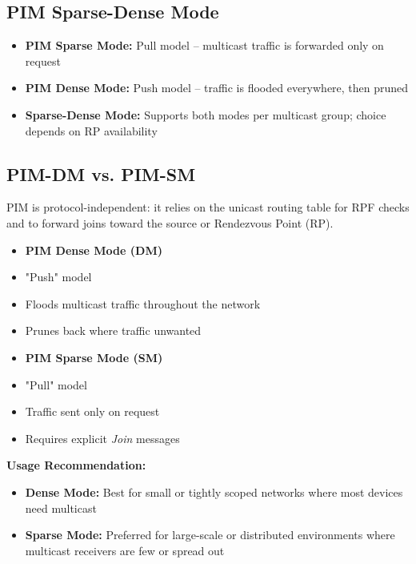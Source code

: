 \begin{multicols*}{5}
		\subsection{PIM Sparse-Dense Mode}
		\begin{itemize}
			\item \textbf{PIM Sparse Mode:} Pull model – multicast traffic is forwarded only on request
			\item \textbf{PIM Dense Mode:} Push model – traffic is flooded everywhere, then pruned
			\item \textbf{Sparse-Dense Mode:} Supports both modes per multicast group; choice depends on RP availability
		\end{itemize}
		
		\subsection{PIM-DM vs. PIM-SM}
		PIM is protocol-independent: it relies on the unicast routing table for RPF checks and to forward joins toward the source or Rendezvous Point (RP).
		
		\noindent\begin{minipage}{\linewidth}
			\setlength\multicolsep{1pt}%
			\begin{multicols}{2}
				\begin{itemize}
					\item \textbf{PIM Dense Mode (DM)}
					\item"Push" model
					\item Floods multicast traffic throughout the network
					\item Prunes back where traffic unwanted
				\end{itemize}
				
				\columnbreak
				
				\begin{itemize}
					\item \textbf{PIM Sparse Mode (SM)}
					\item "Pull" model
					\item Traffic sent only on request
					\item Requires explicit \textit{Join} messages
				\end{itemize}
			\end{multicols}
		\end{minipage}
		\vspace*{-\baselineskip} %
		
		\textbf{Usage Recommendation:}
		\begin{itemize}
			\item \textbf{Dense Mode:} Best for small or tightly scoped networks where most devices need multicast
			\item \textbf{Sparse Mode:} Preferred for large-scale or distributed environments where multicast receivers are few or spread out
		\end{itemize}
		

\end{multicols*}

